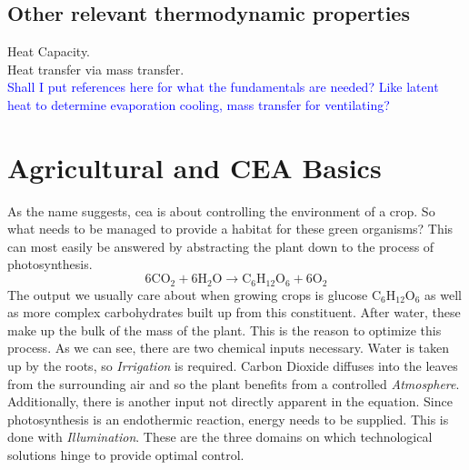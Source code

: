 \subsection{Other relevant thermodynamic properties}
\label{sub:ther-props}
Heat Capacity.\\
Heat transfer via mass transfer.\\
\textcolor{Blue}{Shall I put references here for what the fundamentals are needed? Like latent heat to determine evaporation cooling, mass transfer for ventilating?}




\section{Agricultural and CEA Basics}
\label{sec:fund-cea}
As the name suggests, \acl{cea} is about controlling the environment of a crop.
So what needs to be managed to provide a habitat for these green organisms?
This can most easily be answered by abstracting the plant down to the process of photosynthesis.
$$
6 \text{CO}_2 + 6 \text{H}_2\text{O} \rightarrow \text{C}_6\text{H}_{12}\text{O}_6 + 6 \text{O}_2
$$
The output we usually care about when growing crops is glucose $\text{C}_6\text{H}_{12}\text{O}_6$ as well as more complex carbohydrates built up from this constituent.
After water, these make up the bulk of the mass of the plant.
This is the reason to optimize this process.
As we can see, there are two chemical inputs necessary.
Water is taken up by the roots, so \textit{Irrigation} is required.
Carbon Dioxide diffuses into the leaves from the surrounding air and so the plant benefits from a controlled \textit{Atmosphere}.
Additionally, there is another input not directly apparent in the equation.
Since photosynthesis is an endothermic reaction, energy needs to be supplied.
This is done with \textit{Illumination}.
These are the three domains on which technological solutions hinge to provide optimal control.



